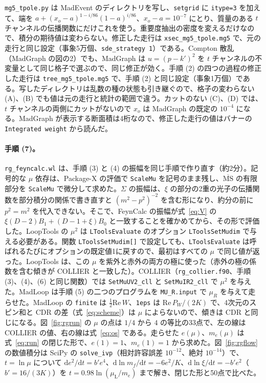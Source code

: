 \documentclass[a4paper,10pt]{ltjsarticle}
\newcommand{\dd}{\mathrm{d}}
\newcommand{\MSbar}{\overline{\mathrm{MS}}}
\begin{document}
\texttt{mg5\_tpole.py} は MadEvent のディレクトリを写し、\texttt{setgrid} に \texttt{itype=3} を加えて、端を $a+(x_o-a)^{1-i/86}(1-a)^{i/86}$、$x_o-a=10^{-7}$ にとり、質量のある $t$ チャンネルの伝播関数にだけこれを使う。重要度抽出の密度を変えるだけなので、積分の期待値は変わらない。修正した走行は \texttt{xsec\_mg5\_tpole.mg5} で、元の走行と同じ設定（事象5万個、\texttt{sde\_strategy 1}）である。Compton 散乱（MadGraph の図の2）でも、MadGraph は $u=(p-k')^2$ を $t$ チャンネルの不変量として同じ格子で選ぶので、同じ修正が効く。手順 (2) の四つの過程の修正した走行は \texttt{tree\_mg5\_tpole.mg5} で、手順 (2) と同じ設定（事象1万個）である。写したディレクトリは乱数の種の状態も引き継ぐので、格子の変わらない (A)、(B) でも値は元の走行と統計の範囲で違う。カットのない (C)、(D) では、$t$ チャンネルの両側にカットがないので $x_o$ は MadGraph の既定の $10^{-4}$ になる。MadGraph が表示する断面積は4桁なので、修正した走行の値はバナーの \texttt{Integrated weight} から読んだ。

\paragraph{手順 (7)。}\texttt{rg\_feyncalc.wl} は、手順 (3) と (4) の振幅を同じ手順で作り直す（約2分）。記号的な $\mu$ 依存は、Package-X の評価で \texttt{ScaleMu} を記号のまま残し、$\MSbar$ の有限部分を \texttt{ScaleMu} で微分して求めた。$\Sigma$ の振幅は、$\xi$ の部分の2重の光子の伝播関数を部分積分の関係で書き直すと $(m^2-p^2)^{-2}$ を含む形になり、約分の前に $p^2=m^2$ を代入できない。そこで、FeynCalc の振幅が式~\eqref{eq:V} の $\xi(D-2)B_1+(D-1+\xi)B_0$ と一致することを確かめてから、その形で評価した。LoopTools の $\mu^2$ は \texttt{LToolsEvaluate} のオプション \texttt{LToolsSetMudim} で与える必要がある。関数 \texttt{LToolsSetMudim[]} で設定しても、\texttt{LToolsEvaluate} は呼ばれるたびにオプションの既定値1に戻すので、最初はすべての $\mu$ で同じ値が返った。LoopTools は、この $\mu$ を紫外と赤外の両方の極に使った（赤外の極の係数を含む傾きが COLLIER と一致した）。COLLIER（\texttt{rg\_collier.f90}、手順 (3)、(4)、(6) と同じ関数）では \texttt{SetMuUV2\_cll} と \texttt{SetMuIR2\_cll} で $\mu^2$ を与えた。MadLoop は手順 (5) の二つのプログラムを \texttt{MU\_R.input} で $\mu_R$ を与えて走らせた。MadLoop の \texttt{finite} は $\frac12\mathrm{Re}\,W$、\texttt{1eps} は $\mathrm{Re}\,P_W/(2K)$ で、4次元のスピン和と CDR の差（式~\eqref{eq:scheme}）は $\mu$ によらないので、傾きは CDR と同じになる。図~\ref{fig:rgrun} の $\mu$ の点は $1/4$ から $4$ の等比の33点で、左の線は COLLIER の値、右の線は式~\eqref{eq:os} である。走らせた $e(\mu)$、$m_e(\mu)$ は式~\eqref{eq:run} の閉じた形で、$e(1)=1$、$m_e(1)=1$ から求めた。図~\ref{fig:rgflow} の数値積分は SciPy の \texttt{solve\_ivp}（相対許容誤差 $10^{-12}$、絶対 $10^{-14}$）で、$t=\ln\mu$ について $\dd e^2/\dd t=b'e^4$、$\dd\ln m_f/\dd t=-6e^2/K$、$\dd\ln\xi/\dd t=-b'e^2$（$b'=16/(3K)$）を $t=0.98\ln(\mu_{\mathrm L}/m_e)$ まで解き、閉じた形と50点で比べた。
\end{document}
